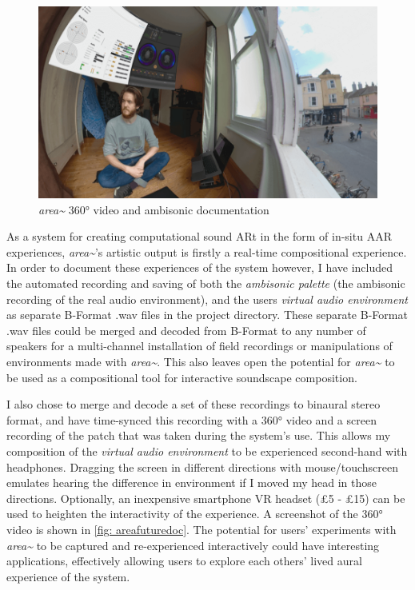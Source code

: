 \begin{figure}
    \centering
    \includegraphics[width=0.75\linewidth]{figures/05-area/areafuturedoc.png}
    \caption{\textit{area\textasciitilde{}} 360° video and ambisonic documentation \citep[from][]{bilbow2020a}}
    \label{fig: areafuturedoc}
\end{figure}
As a system for creating computational sound ARt in the form of in-situ AAR experiences, \textit{area\textasciitilde{}}'s artistic output is firstly a real-time compositional experience. In order to document these experiences of the system however, I have included the automated recording and saving of both the \textit{ambisonic palette} (the ambisonic recording of the real audio environment), and the users \textit{virtual audio environment} as separate B-Format .wav files in the project directory. These separate B-Format .wav files could be merged and decoded from B-Format to any number of speakers for a multi-channel installation of field recordings or manipulations of environments made with \textit{area\textasciitilde{}}. This also leaves open the potential for \textit{area\textasciitilde{}} to be used as a compositional tool for interactive soundscape composition.

I also chose to merge and decode a set of these recordings to binaural stereo format, and have time-synced this recording with a 360° video and a screen recording of the patch that was taken during the system's use. This allows my composition of the \textit{virtual audio environment} to be experienced second-hand with headphones. Dragging the screen in different directions with mouse/touchscreen emulates hearing the difference in environment if I moved my head in those directions. Optionally, an inexpensive smartphone VR headset (\pounds5 - \pounds15) can be used to heighten the interactivity of the experience. A screenshot of the 360° video \citep{bilbow2020} is shown in \autoref{fig: areafuturedoc}. The potential for users' experiments with \textit{area\textasciitilde{}} to be captured and re-experienced interactively could have interesting applications, effectively allowing users to explore each others' lived aural experience of the system.



